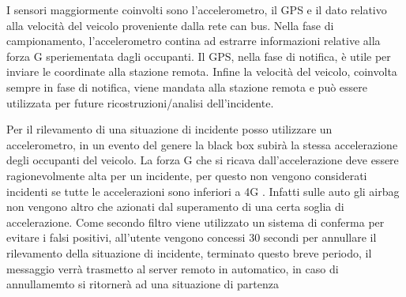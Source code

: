 \documentclass[12pt, a4paper, italian]{report}
\numberwithin{figure}{chapter}
\numberwithin{table}{chapter}
\begin{document}
I sensori maggiormente coinvolti sono l'accelerometro, il GPS e il dato relativo alla velocità del veicolo proveniente dalla rete can bus. Nella fase di campionamento, l'accelerometro contina ad estrarre informazioni relative alla forza G speriementata dagli occupanti. Il GPS, nella fase di notifica, è utile per inviare le coordinate alla stazione remota. Infine la velocità del veicolo, coinvolta sempre in fase di notifica, viene mandata alla stazione remota e può essere utilizzata per future ricostruzioni/analisi dell'incidente. \cite{shubham2021survey}

Per il rilevamento di una situazione di incidente posso utilizzare un accelerometro, in un evento del genere la black box subirà la stessa accelerazione degli occupanti del veicolo. La forza G che si ricava dall'accelerazione deve essere ragionevolmente alta per un incidente, per questo non vengono considerati incidenti se tutte le accelerazioni sono inferiori a 4G \cite{thompson2010using}. Infatti sulle auto gli airbag non vengono altro che azionati dal superamento di una certa soglia di accelerazione. Come secondo filtro viene utilizzato un sistema di conferma per evitare i falsi positivi, all'utente vengono concessi 30 secondi per annullare il rilevamento della situazione di incidente, terminato questo breve periodo, il messaggio verrà trasmetto al server remoto in automatico, in caso di annullamemto si ritornerà ad una situazione di partenza
\end{document}
